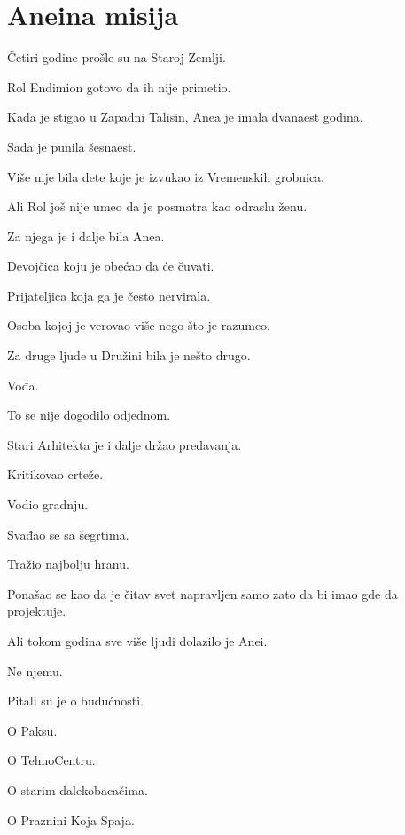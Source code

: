 
\chapter{Aneina misija}


Četiri godine prošle su na Staroj Zemlji.

Rol Endimion gotovo da ih nije primetio.

\bigskip

Kada je stigao u Zapadni Talisin, Anea je imala dvanaest godina.

Sada je punila šesnaest.

Više nije bila dete koje je izvukao iz Vremenskih grobnica.

Ali Rol još nije umeo da je posmatra kao odraslu ženu.

Za njega je i dalje bila Anea.

Devojčica koju je obećao da će čuvati.

Prijateljica koja ga je često nervirala.

Osoba kojoj je verovao više nego što je razumeo.

\bigskip

Za druge ljude u Družini bila je nešto drugo.

Vođa.

\bigskip

To se nije dogodilo odjednom.

Stari Arhitekta je i dalje držao predavanja.

Kritikovao crteže.

Vodio gradnju.

Svađao se sa šegrtima.

Tražio najbolju hranu.

Ponašao se kao da je čitav svet napravljen samo zato da bi imao gde da projektuje.

\bigskip

Ali tokom godina sve više ljudi dolazilo je Anei.

Ne njemu.

\bigskip

Pitali su je o budućnosti.

O Paksu.

O TehnoCentru.

O starim dalekobacačima.

O Praznini Koja Spaja.


